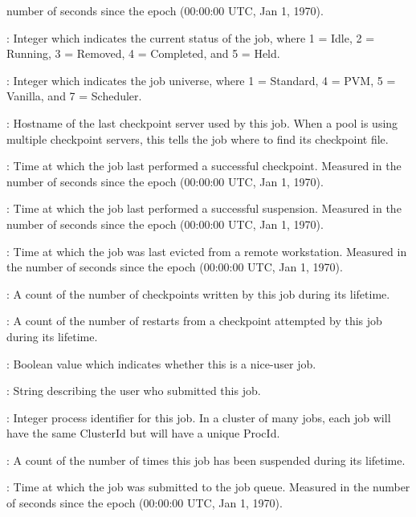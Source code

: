 \begin{description}
number of seconds since the epoch (00:00:00 UTC, Jan 1, 1970).
%
\item[\AdAttr{JobStatus}] : Integer which indicates the current
status of the job, where 1 = Idle, 2 = Running, 3 = Removed, 4 =
Completed, and 5 = Held.
%
\item[\AdAttr{JobUniverse}] : Integer which indicates the job
universe, where 1 = Standard, 4 = PVM, 5 = Vanilla, and 7 = Scheduler.
%
\item[\AdAttr{LastCkptServer}] : Hostname of the last checkpoint
server used by this job.  When a pool is using multiple checkpoint
servers, this tells the job where to find its checkpoint file.
%
\item[\AdAttr{LastCkptTime}] : Time at which the job last performed a
successful checkpoint.  Measured in the number of seconds since the
epoch (00:00:00 UTC, Jan 1, 1970).
%
\item[\AdAttr{LastSuspensionTime}] : Time at which the job last performed a
successful suspension.  Measured in the number of seconds since the
epoch (00:00:00 UTC, Jan 1, 1970).
%
\item[\AdAttr{LastVacateTime}] : Time at which the job was last
evicted from a remote workstation.  Measured in the number of seconds
since the epoch (00:00:00 UTC, Jan 1, 1970).
%
\item[\AdAttr{NumCkpts}] : A count of the number of checkpoints
written by this job during its lifetime.
%
\item[\AdAttr{NumRestarts}] : A count of the number of restarts from a
checkpoint attempted by this job during its lifetime.
%
\item[\AdAttr{NiceUser}] : Boolean value which indicates whether
this is a nice-user job.
%
\item[\AdAttr{Owner}] : String describing the user who submitted this
job.
%
\item[\AdAttr{ProcId}] : Integer process identifier for this job.  In
a cluster of many jobs, each job will have the same ClusterId but will
have a unique ProcId.
%
\item[\AdAttr{TotalSuspensions}] : A count of the number of times this job
has been suspended during its lifetime.
%
\item[\AdAttr{QDate}] : Time at which the job was submitted to the job
queue.  Measured in the
number of seconds since the epoch (00:00:00 UTC, Jan 1, 1970).
%
\end{description}

